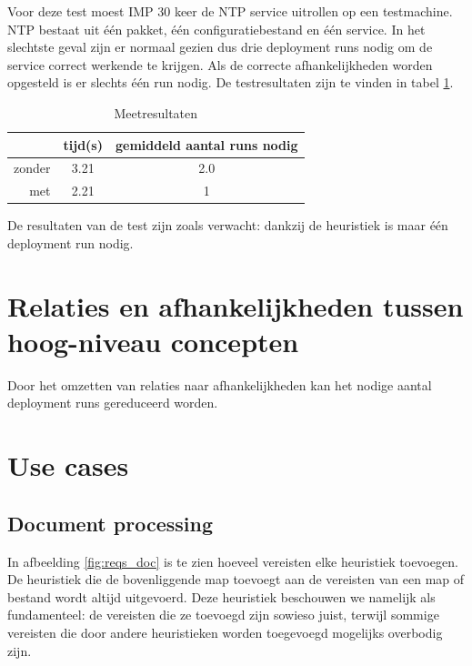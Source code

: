 Voor deze test moest IMP 30 keer de NTP service uitrollen op een testmachine.
NTP bestaat uit \'e\'en pakket, \'e\'en configuratiebestand en \'e\'en service. 
In het slechtste geval zijn er normaal gezien dus drie deployment runs nodig om de service correct werkende te krijgen.
Als de correcte afhankelijkheden worden opgesteld is er slechts \'e\'en run nodig.
De testresultaten zijn te vinden in tabel \ref{table:service_package_dep}.

\begin{table}
  \begin{center}
  \label{table:service_package_dep}
  \begin{tabular}{ r | c | c }
            & tijd(s)   & gemiddeld aantal runs nodig \\ \hline
    zonder  & 3.21      & 2.0 \\ \hline
    met     & 2.21      & 1 \\
  \end{tabular}
  \caption{Meetresultaten}
  \end{center}
\end{table}

De resultaten van de test zijn zoals verwacht: dankzij de heuristiek is maar \'e\'en deployment run nodig.

\section{Relaties en afhankelijkheden tussen hoog-niveau concepten}
Door het omzetten van relaties naar afhankelijkheden kan het nodige aantal deployment runs gereduceerd worden.

\section{Use cases}

\subsection{Document processing}


In afbeelding \ref{fig:reqs_doc} is te zien hoeveel vereisten elke heuristiek toevoegen.
De heuristiek die de bovenliggende map toevoegt aan de vereisten van een map of bestand wordt altijd uitgevoerd.
Deze heuristiek beschouwen we namelijk als fundamenteel: de vereisten die ze toevoegd zijn sowieso juist, terwijl sommige vereisten die door andere heuristieken worden toegevoegd mogelijks overbodig zijn. 

